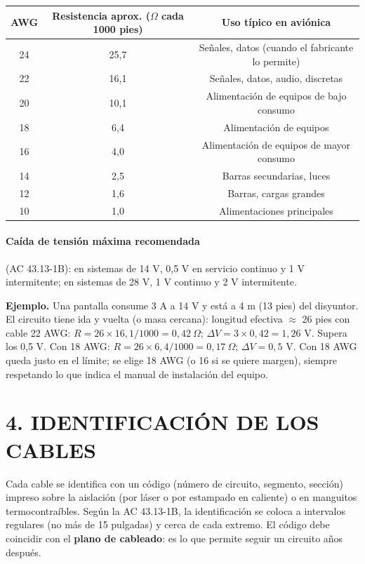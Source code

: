 \begin{center}
\small
\begin{tabular}{|c|c|c|}
\hline
\textbf{AWG} & \textbf{Resistencia aprox. ($\Omega$ cada 1000 pies)} & \textbf{Uso típico en
aviónica} \\ \hline
24 & 25,7 & Señales, datos (cuando el fabricante lo permite) \\ \hline
22 & 16,1 & Señales, datos, audio, discretas \\ \hline
20 & 10,1 & Alimentación de equipos de bajo consumo \\ \hline
18 & 6,4 & Alimentación de equipos \\ \hline
16 & 4,0 & Alimentación de equipos de mayor consumo \\ \hline
14 & 2,5 & Barras secundarias, luces \\ \hline
12 & 1,6 & Barras, cargas grandes \\ \hline
10 & 1,0 & Alimentaciones principales \\ \hline
\end{tabular}
\end{center}

\paragraph*{Caída de tensión máxima recomendada} (AC 43.13-1B): en sistemas de 14 V, 0,5 V en
servicio continuo y 1 V intermitente; en sistemas de 28 V, 1 V continuo y 2 V intermitente.

\begin{recuadro}
\textbf{Ejemplo.} Una pantalla consume 3 A a 14 V y está a 4 m (13 pies) del disyuntor. El circuito
tiene ida y vuelta (o masa cercana): longitud efectiva $\approx$ 26 pies con cable 22 AWG:
$R = 26 \times 16{,}1 / 1000 = 0{,}42\ \Omega$; $\Delta V = 3 \times 0{,}42 = 1{,}26$ V. Supera los
0,5 V. Con 18 AWG: $R = 26 \times 6{,}4/1000 = 0{,}17\ \Omega$; $\Delta V = 0{,}5$ V. Con 18 AWG
queda justo en el límite; se elige 18 AWG (o 16 si se quiere margen), siempre respetando lo que
indica el manual de instalación del equipo.
\end{recuadro}

\section*{4. IDENTIFICACIÓN DE LOS CABLES}

Cada cable se identifica con un código (número de circuito, segmento, sección) impreso sobre la
aislación (por láser o por estampado en caliente) o en manguitos termocontraíbles. Según la AC
43.13-1B, la identificación se coloca a intervalos regulares (no más de 15 pulgadas) y cerca de
cada extremo. El código debe coincidir con el \textbf{plano de cableado}: es lo que permite seguir
un circuito años después.

